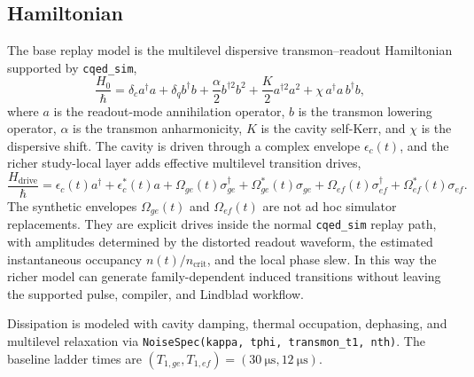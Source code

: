 \documentclass[11pt, a4paper]{article}
\begin{document}
\subsection{Hamiltonian}
The base replay model is the multilevel dispersive transmon--readout Hamiltonian supported
by \texttt{cqed\_sim},
\begin{equation}
\frac{H_0}{\hbar} =
\delta_c a^\dagger a +
\delta_q b^\dagger b +
\frac{\alpha}{2} b^{\dagger 2} b^2 +
\frac{K}{2} a^{\dagger 2} a^2 +
\chi\, a^\dagger a\, b^\dagger b,
\end{equation}
where $a$ is the readout-mode annihilation operator, $b$ is the transmon lowering
operator, $\alpha$ is the transmon anharmonicity, $K$ is the cavity self-Kerr, and
$\chi$ is the dispersive shift. The cavity is driven through a complex envelope
$\epsilon_c(t)$, and the richer study-local layer adds effective multilevel transition
drives,
\begin{equation}
\frac{H_{\mathrm{drive}}}{\hbar} =
\epsilon_c(t)a^\dagger + \epsilon_c^*(t)a +
\Omega_{ge}(t)\sigma_{ge}^\dagger + \Omega_{ge}^*(t)\sigma_{ge} +
\Omega_{ef}(t)\sigma_{ef}^\dagger + \Omega_{ef}^*(t)\sigma_{ef}.
\end{equation}
The synthetic envelopes $\Omega_{ge}(t)$ and $\Omega_{ef}(t)$ are not ad hoc simulator
replacements. They are explicit drives inside the normal \texttt{cqed\_sim} replay path,
with amplitudes determined by the distorted readout waveform, the estimated instantaneous
occupancy $n(t)/n_{\mathrm{crit}}$, and the local phase slew. In this way the richer model
can generate family-dependent induced transitions without leaving the supported pulse,
compiler, and Lindblad workflow.

Dissipation is modeled with cavity damping, thermal occupation, dephasing, and multilevel
relaxation via \texttt{NoiseSpec(kappa, tphi, transmon\_t1, nth)}. The baseline ladder
times are $(T_{1,ge}, T_{1,ef}) = (\SI{30}{\micro\second}, \SI{12}{\micro\second})$.
\end{document}
